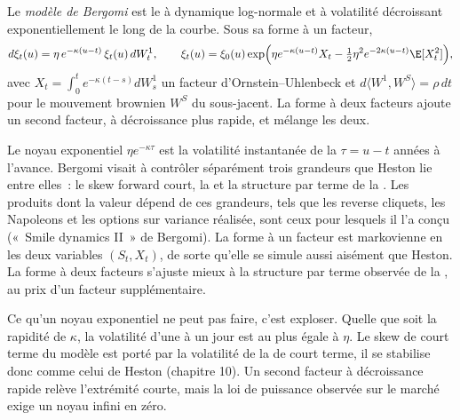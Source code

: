 \begin{definition}\label{def:dv:rough-volatility-and-forward-variance-models:bergomi}
Le \emph{modèle de Bergomi} est le  à dynamique log-normale et à volatilité
décroissant exponentiellement le long de la courbe. Sous sa forme à un facteur,
\[
d\xi_t(u)=\eta\,e^{-\kappa(u-t)}\,\xi_t(u)\,dW^1_t,\qquad
\xi_t(u)=\xi_0(u)\exp\Bigl(\eta e^{-\kappa(u-t)}X_t-\tfrac12\eta^2e^{-2\kappa(u-t)}\E[X_t^2]\Bigr),
\]
avec $X_t=\int_0^te^{-\kappa(t-s)}dW^1_s$ un facteur d'Ornstein--Uhlenbeck et $d\langle W^1,W^S\rangle=\rho\,dt$
pour le mouvement brownien $W^S$ du sous-jacent. La forme à deux facteurs ajoute un second facteur, à décroissance plus rapide,
et mélange les deux.
\end{definition}

Le noyau exponentiel $\eta e^{-\kappa\tau}$ est la volatilité instantanée de la 
$\tau=u-t$ années à l'avance. Bergomi visait à contrôler séparément trois grandeurs que Heston lie entre elles~: le
skew forward court, la  et la structure par terme de la . Les produits dont la valeur dépend de ces grandeurs, tels que les reverse cliquets, les Napoleons et les options
sur variance réalisée, sont ceux pour lesquels il l'a conçu («~Smile dynamics II~» de Bergomi). La forme à un facteur
est markovienne en les deux variables $(S_t,X_t)$, de sorte qu'elle se simule aussi aisément que Heston. La forme à deux facteurs
s'ajuste mieux à la structure par terme observée de la , au prix d'un facteur supplémentaire.

Ce qu'un noyau exponentiel ne peut pas faire, c'est exploser. Quelle que soit la rapidité de $\kappa$, la volatilité d'une
 à un jour est au plus égale à $\eta$. Le skew de court terme du modèle est porté par la volatilité
de la  de court terme, il se stabilise donc comme celui de Heston (chapitre 10). Un second facteur à
décroissance rapide relève l'extrémité courte, mais la loi de puissance observée sur le marché exige un noyau infini en zéro.

